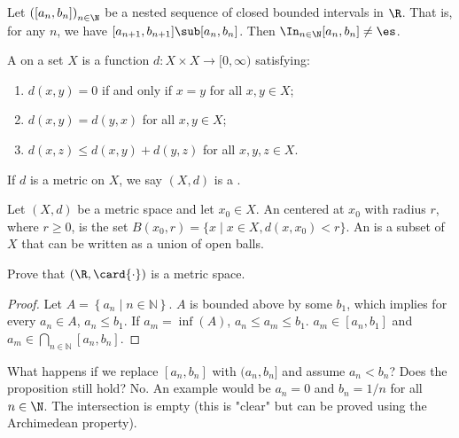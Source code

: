 \documentclass[10pt]{article}
\begin{document}

\begin{definition}
    
\end{definition}
\begin{proposition}
    Let ${([{a}_{n},{b}_{n}])}_{n\in\N}$ be a nested sequence of closed bounded intervals in $\R$. That is, for any $n$, we have $[{a}_{n+1},{b}_{n+1}]\sub[{a}_{n},{b}_{n}]$. Then ${\In}_{n\in\N}[{a}_{n},{b}_{n}]\ne\es$.
\end{proposition}
\begin{definition}
    A  on a set $X$ is a function $d:X\times X\to[0,\infty)$ satisfying:
    \begin{enumerate}
        \item $d(x,y)=0$ if and only if $x=y$ for all $x,y\in X$;
        \item $d(x,y)=d(y,x)$ for all $x,y\in X$;
        \item $d(x,z)\le d(x,y)+d(y,z)$ for all $x,y,z\in X$.
    \end{enumerate}
    If $d$ is a metric on $X$, we say $(X,d)$ is a .
\end{definition}
\begin{definition}
    Let $(X,d)$ be a metric space and let ${x}_{0}\in X$. An  centered at ${x}_{0}$ with radius $r$, where $r\ge 0$, is the set $B({x}_{0},r)=\{x\mid x\in X,d(x,{x}_{0})<r\}$. An  is a subset of $X$ that can be written as a union of open balls.
\end{definition}
\begin{problem}
    Prove that $(\R,\card{\cdot})$ is a metric space.
\end{problem}
\begin{proof}
    Let $A=\left \{ a_n\mid n\in \mathbb{N} \right \}$. $A$ is bounded above by some $b_1$, which implies for every $a_n\in A$, $a_n\leq b_1$. If ${a}_{m}=\inf(A)$, $a_n\leq a_m\leq b_1$. $a_m\in [a_n,b_1]$ and $a_m\in \bigcap_{n\in \mathbb{N}}^{} [a_n,b_n]$.
\end{proof}
\par
What happens if we replace $[a_n,b_n]$ with $(a_n,b_n]$ and assume $a_n<b_n$? Does the proposition still hold? No. An example would be $a_n=0$ and $b_n={1}/{n}$ for all $n\in\N$. The intersection is empty (this is "clear" but can be proved using the Archimedean property).
\end{document}
